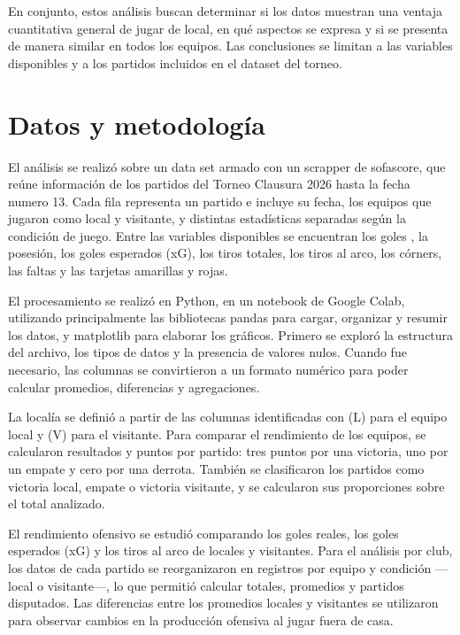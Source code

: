 \documentclass[12pt,a4paper]{article}
\begin{document}
En conjunto, estos análisis buscan determinar si los datos muestran una ventaja cuantitativa general de jugar de local, en qué aspectos se expresa y si se presenta de manera similar en todos los equipos. Las conclusiones se limitan a las variables disponibles y a los partidos incluidos en el dataset del torneo.

\section{Datos y metodología}
El análisis se realizó sobre un data set armado con un scrapper de sofascore, que reúne información de los partidos del Torneo Clausura 2026 hasta la fecha numero 13. Cada fila representa un partido e incluye su fecha, los equipos que jugaron como local y visitante, y distintas estadísticas separadas según la condición de juego. Entre las variables disponibles se encuentran los goles , la posesión, los goles esperados (xG), los tiros totales, los tiros al arco, los córners, las faltas y las tarjetas amarillas y rojas.

El procesamiento se realizó en Python, en un notebook de Google Colab, utilizando principalmente las bibliotecas pandas para cargar, organizar y resumir los datos, y matplotlib para elaborar los gráficos. Primero se exploró la estructura del archivo, los tipos de datos y la presencia de valores nulos. Cuando fue necesario, las columnas se convirtieron a un formato numérico para poder calcular promedios, diferencias y agregaciones.

La localía se definió a partir de las columnas identificadas con (L) para el equipo local y (V) para el visitante. Para comparar el rendimiento de los equipos, se calcularon resultados y puntos por partido: tres puntos por una victoria, uno por un empate y cero por una derrota. También se clasificaron los partidos como victoria local, empate o victoria visitante, y se calcularon sus proporciones sobre el total analizado.

El rendimiento ofensivo se estudió comparando los goles reales, los goles esperados (xG) y los tiros al arco de locales y visitantes. Para el análisis por club, los datos de cada partido se reorganizaron en registros por equipo y condición —local o visitante—, lo que permitió calcular totales, promedios y partidos disputados. Las diferencias entre los promedios locales y visitantes se utilizaron para observar cambios en la producción ofensiva al jugar fuera de casa.
\end{document}
